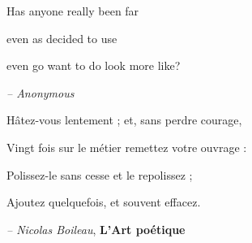 \leavevmode
\vfill 


\begin{flushright}
	Has anyone really been far
	
	even as decided to use 
	
	even go want to do look more like? \medskip
	
	\textit{-- Anonymous}
	
	\vspace{2cm}
	
	Hâtez-vous lentement ; et, sans perdre courage,
	
	Vingt fois sur le métier remettez votre ouvrage :
	
	Polissez-le sans cesse et le repolissez ;
	
	Ajoutez quelquefois, et souvent effacez.  \medskip
	
	\textit{-- Nicolas Boileau}, \textbf{L'Art poétique}
	
\end{flushright}


\vfill
